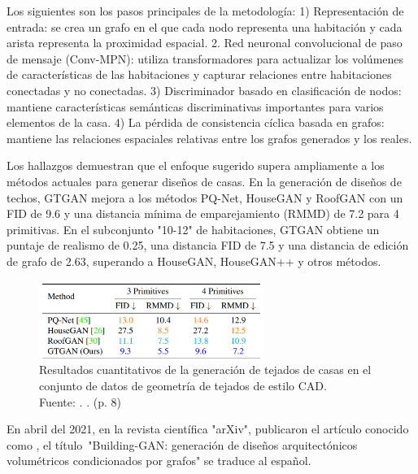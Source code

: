 Los siguientes son los pasos principales de la metodología: 1) Representación de entrada: se crea un grafo en el que cada nodo representa una habitación y cada arista representa la proximidad espacial. 2. Red neuronal convolucional de paso de mensaje (Conv-MPN): utiliza transformadores para actualizar los volúmenes de características de las habitaciones y capturar relaciones entre habitaciones conectadas y no conectadas. 3) Discriminador basado en clasificación de nodos: mantiene características semánticas discriminativas importantes para varios elementos de la casa. 4) La pérdida de consistencia cíclica basada en grafos: mantiene las relaciones espaciales relativas entre los grafos generados y los reales.

Los hallazgos demuestran que el enfoque sugerido supera ampliamente a los métodos actuales para generar diseños de casas. En la generación de diseños de techos, GTGAN mejora a los métodos PQ-Net, HouseGAN y RoofGAN con un FID de 9.6 y una distancia mínima de emparejamiento (RMMD) de 7.2 para 4 primitivas. En el subconjunto "10-12" de habitaciones, GTGAN obtiene un puntaje de realismo de 0.25, una distancia FID de 7.5 y una distancia de edición de grafo de 2.63, superando a HouseGAN, HouseGAN++ y otros métodos.

\begin{figure}[!ht]
	\begin{center}
		\includegraphics[width=0.65\textwidth]{2/figures/tang2023.png}
		\caption[Resultados cuantitativos de la generación de tejados de casas en el conjunto de datos de geometría de tejados de estilo CAD]{Resultados cuantitativos de la generación de tejados de casas en el conjunto de datos de geometría de tejados de estilo CAD.\\
		Fuente: \cite{pr_tang2023graphtransfor}. . (p. 8)}
		\label{2:fig126}
	\end{center}
\end{figure}

\newpage
En abril del 2021, en la revista científica "arXiv", \cite{pr_chang2021buildinggan} publicaron el artículo conocido como , el título "Building-GAN: generación de diseños arquitectónicos volumétricos condicionados por grafos" se traduce al español.

